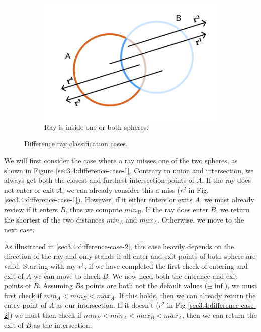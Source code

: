 \documentclass[a4paper,11pt,oneside]{article}
\begin{document}
\begin{figure}[ht]
\begin{subfigure}[b]{0.3\textwidth}
         \includegraphics[width=\textwidth]{section3/3.4/difference-case-3.png}
         \caption{Ray is inside one or both spheres.}
         \label{sec3.4:difference-case-3}
     \end{subfigure}
        \caption{Difference ray classification cases.}
        \label{sec3.4:sphere-difference}
\end{figure}


We will first consider the case where a ray misses one of the two spheres, as shown in Figure \ref{sec3.4:difference-case-1}.  
Contrary to union and intersection, we always get both the closest and furthest intersection points of $A$. If the ray does not enter or exit $A$, we can already consider this a miss ($r^2$ in Fig. \ref{sec3.4:difference-case-1}). However, if it either enters or exits $A$, we must already review if it enters $B$, thus we compute $min_B$. If the ray does enter $B$, we return the shortest of the two distances $min_A$ and $max_A$. Otherwise, we move to the next case.

As illustrated in \ref{sec3.4:difference-case-2}, this case heavily depends on the direction of the ray and only stands if all enter and exit points of both sphere are valid. Starting with ray $r^1$, if we have completed the first check of entering and exit of $A$ we can move to check $B$. We now need both the entrance and exit points of $B$. Assuming $B$s points are both not the default values ($\pm\inf$), we must first check if $min_A < min_B < max_A$. If this holds, then we can already return the entry point of $A$ as our intersection. If it doesn't ($r^2$ in Fig \ref{sec3.4:difference-case-2}) we must then check if $min_B < min_A < max_B < max_A$, then we can return the exit of $B$ as the intersection.
\end{document}
